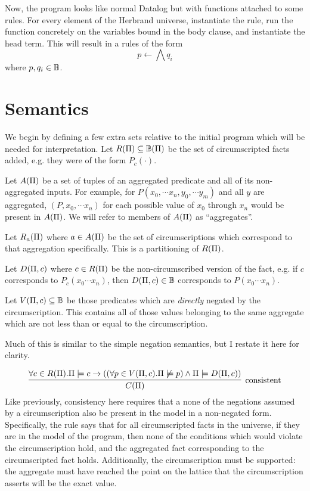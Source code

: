 Now, the program looks like normal Datalog but with functions attached to some rules.
For every element of the Herbrand universe, instantiate the rule, run the function concretely on the variables bound in the body clause, and instantiate the head term.
This will result in a rules of the form
\[
	p \leftarrow \bigwedge q_i
\]
where $p, q_i \in \mathbb{B}$.

\section{Semantics}
\label{formal:sec:semantics}
We begin by defining a few extra sets relative to the initial program which will be needed for interpretation.
Let $R(\Pi) \subseteq \mathbb{B}(\Pi)$ be the set of circumscripted facts added, e.g. they were of the form $P_c(\cdot)$.

Let $A(\Pi)$ be a set of tuples of an aggregated predicate and all of its non-aggregated inputs.
For example, for $P(x_0, \cdots x_n, y_0, \cdots y_m)$ and all $y$ are aggregated, $(P, x_0, \cdots x_n)$ for each possible value of $x_0$ through $x_n$ would be present in $A(\Pi)$.
We will refer to members of $A(\Pi)$ as ``aggregates''.

Let $R_a(\Pi)$ where $a \in A(\Pi)$ be the set of circumscriptions which correspond to that aggregation specifically.
This is a partitioning of $R(\Pi)$.

Let $D(\Pi, c)$ where $c \in R(\Pi)$ be the non-circumscribed version of the fact, e.g. if $c$ corresponds to $P_c(x_0 \cdots x_n)$, then $D(\Pi, c) \in \mathbb{B}$ corresponds to $P(x_0 \cdots x_n)$.

Let $V(\Pi, c) \subseteq \mathbb{B}$ be those predicates which are \emph{directly} negated by the circumscription.
This contains all of those values belonging to the same aggregate which are not less than or equal to the circumscription.


Much of this is similar to the simple negation semantics, but I restate it here for clarity.

\[
	\infer[\textrm{consistent}]{\cons{\Pi}}{\forall c \in \circset(\Pi). \Pi \models c \imp ((\forall p \in \viol{\Pi}{c}. \Pi \not \models p) \wedge \Pi \models \decirc{\Pi}{c})}
\]
Like previously, consistency here requires that a none of the negations assumed by a circumscription also be present in the model in a non-negated form.
Specifically, the rule says that for all circumscripted facts in the universe, if they are in the model of the program, then none of the conditions which would violate the circumscription hold, and the aggregated fact corresponding to the circumscripted fact holds.
Additionally, the circumscription must be supported: the aggregate must have reached the point on the lattice that the circumscription asserts will be the exact value.


